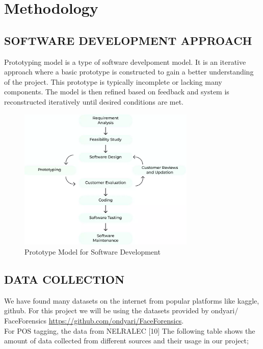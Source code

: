     \chapter{Methodology}
       \section{SOFTWARE DEVELOPMENT APPROACH}
        Prototyping model is a type of software develpoment model. It is an iterative approach where a basic prototype is constructed to gain a better understanding of the project. This prototype is typically incomplete or lacking many components. The model is then refined based on feedback and system is reconstructed iteratively until desired conditions are met.
         \begin{figure}[hbt!]
            \centering
                \includegraphics[width=0.75\textwidth]{./img/prototype model.png}
                \caption{Prototype Model for Software Development}
        \end{figure}
        \section{DATA COLLECTION}
        We have found many datasets on the internet from popular platforms like kaggle, github. For this project we will be using the datasets provided by ondyari/ FaceForensics \url{https://github.com/ondyari/FaceForensics}.\\
            For POS tagging, the data from NELRALEC [10] The following table shows the amount
            of data collected from different sources and their usage in our project;

